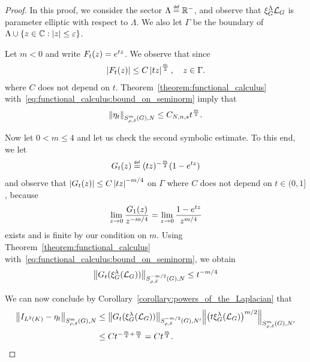 \begin{proof}
    In this proof, we consider the sector $\Lambda \defeq \R^-$,
    and observe that $\Rep \Lambda \Laplacian$ is parameter elliptic with respect to $\Lambda$.
    We also let $\Gamma$ be the boundary of $\Lambda \cup \{z \in \C : \abs z \leq \epsilon\}$.

    Let $m < 0$ and write $F_t(z) = {\e^{t z}}$.
    We observe that since
    \begin{align*}
        \abs {F_t(z)} \leq C \abs {t z}^\frac m 2,
        \quad z \in \Gamma.
    \end{align*}
    where $C$ does not depend on $t$.
    Theorem~\ref{theorem:functional_calculus} with~\eqref{eq:functional_calculus:bound_on_seminorm} imply that
    \begin{align*}
        \SymbolSemiNorm {m} {\rho, \delta} N {\eta_t}
        \leq C_{N, n, s} t^{\frac m 2}.
    \end{align*}

    Now let $0 < m \leq 4$ and let us check the second symbolic estimate.
    To this end,
    we let
    \begin{align*}
        G_t(z) \defeq (t z)^{-\frac m 2} (1 - \e^{t z})
    \end{align*}
    and observe that $\abs {G_t(z)} \leq C \abs {t z}^{-m/4}$ on $\Gamma$ where $C$ does not depend on $t \in (0, 1]$,
    because
    \begin{align*}
        \lim_{z \to 0} \frac {G_1(z)}{z^{-m / 4}}
        = \lim_{z \to 0} \frac {1 - \e^{t z}} {z^{m / 4}}
    \end{align*}
    exists and is finite by our condition on $m$.
    Using Theorem~\ref{theorem:functional_calculus} with~\eqref{eq:functional_calculus:bound_on_seminorm},
    we obtain
    \begin{align*}
        \SymbolSemiNorm {-m/2} {\rho, \delta} N {G_t(\Rep \lambda (\Laplacian))}
        \leq t^{-m/4}
    \end{align*}

    We can now conclude by Corollary~\ref{corollary:powers_of_the_Laplacian} that
    \begin{align*}
        \SymbolSemiNorm {m} {\rho, \delta } N {\Id {\Lebesgue 2 \CompactGroup} - \eta_t}
        &\leq
        \SymbolSemiNorm {-m/2} {\rho, \delta} {N'} {G_t(\Rep \lambda (\Laplacian))}
        \SymbolSemiNorm {m} {\rho, \delta} {N'} {\left(t \Rep \lambda (\Laplacian)\right)^{m/2}}\\
        &\leq C t^{-\frac m 4 + \frac m 2} = C t^\frac m 2.
    \end{align*}
\end{proof}

